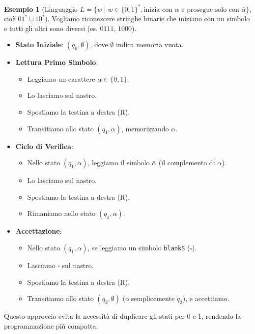 \documentclass[a4paper]{article}
\theoremstyle{definition} %
\newtheorem{example}{Esempio}
\newcommand{\blankS}{\ensuremath{\square}}
\begin{document}
\begin{example}[Linguaggio $L = \{w \mid w \in \{0,1\}^*, \text{inizia con } \alpha \text{ e prosegue solo con } \bar{\alpha} \}$, cioè $01^* \cup 10^*$]
Vogliamo riconoscere stringhe binarie che iniziano con un simbolo e tutti gli altri sono diversi (es. $0111$, $1000$).
\begin{itemize}
    \item \textbf{Stato Iniziale}: $(q_0, \emptyset)$, dove $\emptyset$ indica memoria vuota.
    \item \textbf{Lettura Primo Simbolo}:
        \begin{itemize}
            \item Leggiamo un carattere $\alpha \in \{0,1\}$.
            \item Lo lasciamo sul nastro.
            \item Spostiamo la testina a destra (R).
            \item Transitiamo allo stato $(q_1, \alpha)$, memorizzando $\alpha$.
        \end{itemize}
    \item \textbf{Ciclo di Verifica}:
        \begin{itemize}
            \item Nello stato $(q_1, \alpha)$, leggiamo il simbolo $\bar{\alpha}$ (il complemento di $\alpha$).
            \item Lo lasciamo sul nastro.
            \item Spostiamo la testina a destra (R).
            \item Rimaniamo nello stato $(q_1, \alpha)$.
        \end{itemize}
    \item \textbf{Accettazione}:
        \begin{itemize}
            \item Nello stato $(q_1, \alpha)$, se leggiamo un simbolo \texttt{blankS} ($\blankS$).
            \item Lasciamo $\blankS$ sul nastro.
            \item Spostiamo la testina a destra (R).
            \item Transitiamo allo stato $(q_2, \emptyset)$ (o semplicemente $q_2$), e accettiamo.
        \end{itemize}
\end{itemize}
Questo approccio evita la necessità di duplicare gli stati per 0 e 1, rendendo la programmazione più compatta.
\end{example}
\end{document}
